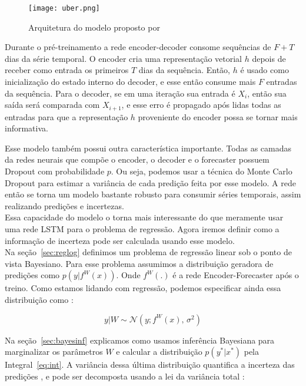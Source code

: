 \begin{figure}[H]
\centering
\texttt{[image: uber.png]}
\caption{Arquitetura do modelo proposto por \cite{ubertime}}
\end{figure}


Durante o pré-treinamento a rede encoder-decoder consome sequências de $F + T$ dias
da série temporal. O encoder cria uma representação vetorial $h$ depois de
receber como entrada os primeiros $T$ dias da sequência. Então, $h$ é usado como
inicialização do estado interno do decoder, e esse então consume mais $F$
entradas da sequência. Para o decoder, se em uma iteração sua entrada é $X_i$,
então sua saída será comparada com $X_{i+1}$, e esse erro é propagado após lidas
todas as entradas para que a representação $h$ proveniente do encoder possa se
tornar mais informativa.


Esse modelo também possui outra característica importante. Todas as camadas da
redes neurais que compõe o encoder, o decoder e o forecaster possuem
Dropout com probabilidade $p$. Ou seja, podemos usar a técnica do Monte
Carlo Dropout para estimar a variância de cada predição feita por esse modelo. A
rede então se torna um modelo bastante robusto para consumir séries temporais,
assim realizando predições e incertezas.\\


Essa capacidade do modelo o torna mais interessante do que meramente usar uma
rede LSTM para o problema de regressão. Agora iremos definir como a informação
de incerteza pode ser calculada usando esse modelo. \\

Na seção~\ref{sec:reglog} definimos um problema de regressão linear sob o ponto
de vista Bayesiano. Para esse problema assumimos a distribuição geradora de
predições como $p(y |f^W(x))$. Onde $f^W(.)$ é a rede Encoder-Forecaster após o treino.
Como estamos lidando com regressão, podemos especificar ainda essa distribuição
como \citep{ubertime}:  

\begin{equation}
  \label{eq:reg}
 y| W \sim \mathcal{N}(y;f^W(x),\,\sigma^2)
\end{equation}

 Na seção~\ref{sec:bayesinf} explicamos como usamos inferência
 Bayesiana para marginalizar os parâmetros $W$ e calcular a distribuição $p(y^*
 | x^*)$ pela Integral~\ref{eq:int}. A variância dessa última distribuição quantifica a incerteza das predições
 \citep{dropbayes}, e pode ser decomposta usando a lei da variância total \citep{ubertime}: \\



